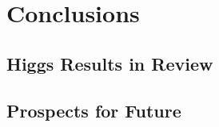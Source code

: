 \chapter[Conclusions][Conclusions]{Conclusions}
\section{Higgs Results in Review}
\section{Prospects for Future}


